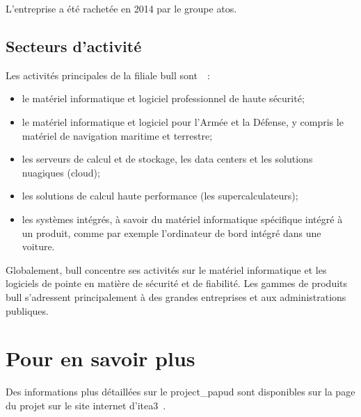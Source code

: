 L'entreprise a été rachetée en 2014 par le groupe \gls{atos}.

\pagebreak
\subsection{Secteurs d'activité} \label{def:cloud} \label{def:data centers}
Les activités principales de la filiale \gls{bull} sont~\autocite{bull_produits}~:
\begin{itemize}
	\item le matériel informatique et logiciel professionnel de haute sécurité;
	\item le matériel informatique et logiciel pour l'Armée et la Défense, y compris le matériel de navigation maritime et terrestre;
	\item les serveurs de calcul et de stockage, les \gls{data centers} et les solutions nuagiques (\gls{cloud});
	\item les solutions de calcul haute performance (les \og supercalculateurs\fg{});
	\item les systèmes intégrés, à savoir du matériel informatique spécifique intégré à un produit, comme par exemple l'ordinateur de bord intégré dans une voiture.
\end{itemize}
\vspace{1em}

Globalement, \gls{bull} concentre ses activités sur le matériel informatique et les logiciels de pointe en matière de sécurité et de fiabilité.
Les gammes de produits \gls{bull} s'adressent principalement à des grandes entreprises et aux administrations publiques.

\section*{Pour en savoir plus}
Des informations plus détaillées sur le \gls{project_papud} sont disponibles sur la page du projet sur le site internet d'\gls{itea3}~\autocite{about_papud}.